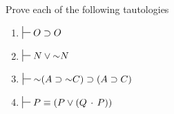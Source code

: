 {%

\noindent\problempart
Prove each of the following tautologies
\begin{enumerate}[label=(\arabic*)]

\item $\sststile{}{} O \eif O$		%
%
%
%

\item $\sststile{}{} N \eor \enot N$ \label{theorem_ExcludedMiddle}

%
%

\item $\sststile{}{} \enot(A \eif \enot C) \eif (A \eif C)$

%	
%	

\item $\sststile{}{} P \eiff (P \eor (Q \eand P))$ 

%
%


\end{enumerate}}
